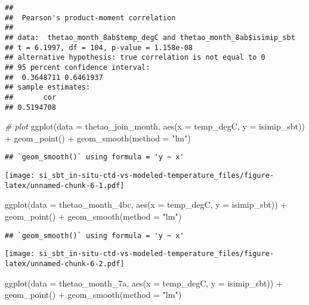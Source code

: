 \documentclass[
]{article}
\newenvironment{Shaded}{\begin{snugshade}}{\end{snugshade}}
\newcommand{\AttributeTok}[1]{\textcolor[rgb]{0.77,0.63,0.00}{#1}}
\newcommand{\CommentTok}[1]{\textcolor[rgb]{0.56,0.35,0.01}{\textit{#1}}}
\newcommand{\FunctionTok}[1]{\textcolor[rgb]{0.00,0.00,0.00}{#1}}
\newcommand{\NormalTok}[1]{#1}
\newcommand{\SpecialCharTok}[1]{\textcolor[rgb]{0.00,0.00,0.00}{#1}}
\newcommand{\StringTok}[1]{\textcolor[rgb]{0.31,0.60,0.02}{#1}}
\begin{document}
\begin{verbatim}
## 
##  Pearson's product-moment correlation
## 
## data:  thetao_month_8ab$temp_degC and thetao_month_8ab$isimip_sbt
## t = 6.1997, df = 104, p-value = 1.158e-08
## alternative hypothesis: true correlation is not equal to 0
## 95 percent confidence interval:
##  0.3648711 0.6461937
## sample estimates:
##       cor 
## 0.5194708
\end{verbatim}

\begin{Shaded}
\begin{Highlighting}[]
\CommentTok{\# plot}
\FunctionTok{ggplot}\NormalTok{(}\AttributeTok{data =}\NormalTok{ thetao\_join\_month, }\FunctionTok{aes}\NormalTok{(}\AttributeTok{x =}\NormalTok{ temp\_degC, }\AttributeTok{y =}\NormalTok{ isimip\_sbt)) }\SpecialCharTok{+} \FunctionTok{geom\_point}\NormalTok{() }\SpecialCharTok{+} \FunctionTok{geom\_smooth}\NormalTok{(}\AttributeTok{method =} \StringTok{"lm"}\NormalTok{)}
\end{Highlighting}
\end{Shaded}

\begin{verbatim}
## `geom_smooth()` using formula = 'y ~ x'
\end{verbatim}

\texttt{[image: si\_sbt\_in-situ-ctd-vs-modeled-temperature\_files/figure-latex/unnamed-chunk-6-1.pdf]}

\begin{Shaded}
\begin{Highlighting}[]
\FunctionTok{ggplot}\NormalTok{(}\AttributeTok{data =}\NormalTok{ thetao\_month\_4bc, }\FunctionTok{aes}\NormalTok{(}\AttributeTok{x =}\NormalTok{ temp\_degC, }\AttributeTok{y =}\NormalTok{ isimip\_sbt)) }\SpecialCharTok{+} \FunctionTok{geom\_point}\NormalTok{() }\SpecialCharTok{+} \FunctionTok{geom\_smooth}\NormalTok{(}\AttributeTok{method =} \StringTok{"lm"}\NormalTok{)}
\end{Highlighting}
\end{Shaded}

\begin{verbatim}
## `geom_smooth()` using formula = 'y ~ x'
\end{verbatim}

\texttt{[image: si\_sbt\_in-situ-ctd-vs-modeled-temperature\_files/figure-latex/unnamed-chunk-6-2.pdf]}

\begin{Shaded}
\begin{Highlighting}[]
\FunctionTok{ggplot}\NormalTok{(}\AttributeTok{data =}\NormalTok{ thetao\_month\_7a, }\FunctionTok{aes}\NormalTok{(}\AttributeTok{x =}\NormalTok{ temp\_degC, }\AttributeTok{y =}\NormalTok{ isimip\_sbt)) }\SpecialCharTok{+} \FunctionTok{geom\_point}\NormalTok{() }\SpecialCharTok{+} \FunctionTok{geom\_smooth}\NormalTok{(}\AttributeTok{method =} \StringTok{"lm"}\NormalTok{)}
\end{Highlighting}
\end{Shaded}
\end{document}
